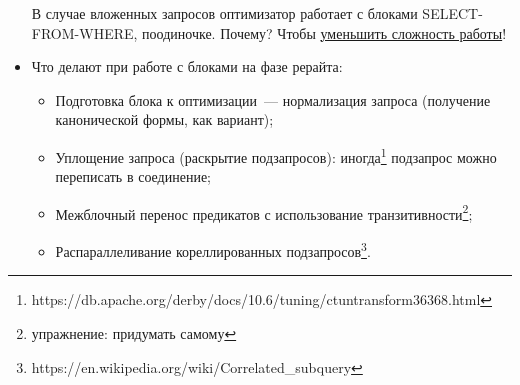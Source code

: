\documentclass{beamer}
\begin{document}
\begin{frame}[allowframebreaks]
\begin{itemize}
  В случае вложенных запросов оптимизатор работает с блоками SELECT-FROM-WHERE, поодиночке. Почему? Чтобы \underline{уменьшить сложность работы}!
  
  \item Что делают при работе с блоками на фазе рерайта:
  \begin{itemize}
    \setlength\itemsep{1em}
    \item Подготовка блока к оптимизации~--- нормализация запроса (получение канонической формы, как вариант);
    \item Уплощение запроса (раскрытие подзапросов): иногда\footnote{https://db.apache.org/derby/docs/10.6/tuning/ctuntransform36368.html} подзапрос можно переписать в соединение;
    \item Межблочный перенос предикатов с использование транзитивности\footnote{упражнение: придумать самому};
    \item Распараллеливание кореллированных подзапросов\footnote{https://en.wikipedia.org/wiki/Correlated\_subquery}.
  \end{itemize}
\end{itemize}

\end{frame}

\end{document}
